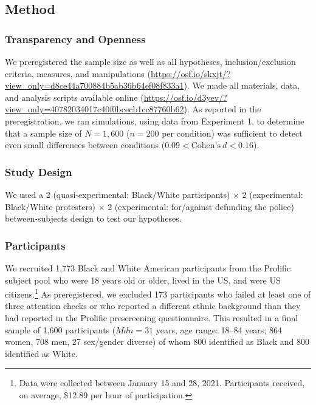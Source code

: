 \documentclass[12pt, letterpaper]{article}
\begin{document}
\hypertarget{method-1}{%
\subsection{Method}\label{method-1}}

\hypertarget{transparency-and-openness-1}{%
\subsubsection{Transparency and
Openness}\label{transparency-and-openness-1}}

We preregistered the sample size as well as all hypotheses,
inclusion/exclusion criteria, measures, and manipulations
(\url{https://osf.io/skxjt/?view_only=d8ce44a700884b5ab36b64ef08f833a1}).
We made all materials, data, and analysis scripts available online
(\url{https://osf.io/d3yev/?view_only=40782034017c40f0bcecb1cc87760b62}).
As reported in the preregistration, we ran simulations, using data from
Experiment 1, to determine that a sample size of \(N = 1,600\)
(\(n = 200\) per condition) was sufficient to detect even small
differences between conditions (\(0.09 < \text{Cohen's}~d < 0.16\)).

\hypertarget{study-design-1}{%
\subsubsection{Study Design}\label{study-design-1}}

We used a 2 (quasi-experimental: Black/White participants) \(\times\) 2
(experimental: Black/White protesters) \(\times\) 2 (experimental:
for/against defunding the police) between-subjects design to test our
hypotheses.

\hypertarget{participants-1}{%
\subsubsection{Participants}\label{participants-1}}

We recruited 1,773 Black and White American participants from the
Prolific subject pool who were 18 years old or older, lived in the US,
and were US citizens.\footnote{Data were collected between January 15
  and 28, 2021. Participants received, on average, \$12.89 per hour of
  participation.} As preregistered, we excluded 173 participants who
failed at least one of three attention checks or who reported a
different ethnic background than they had reported in the Prolific
prescreening questionnaire. This resulted in a final sample of 1,600
participants (\(\textit{Mdn} = 31\) years, age range: 18--84 years; 864
women, 708 men, 27 sex/gender diverse) of whom 800 identified as Black
and 800 identified as White.
\end{document}

